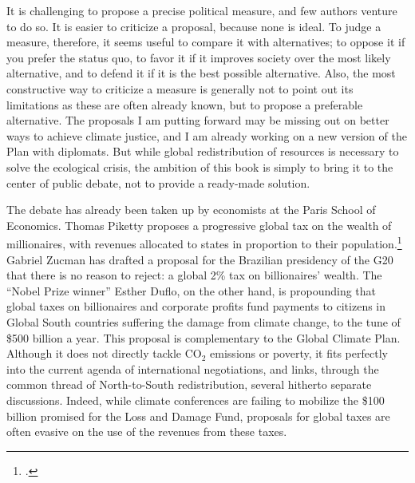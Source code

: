 \documentclass[a5paper,english,openany]{memoir}
\begin{document}
It is challenging %
to propose a precise political measure, and few authors %
venture to do so. It is easier to criticize %
a proposal, because none is ideal. To judge a measure, therefore, it seems useful to compare it with alternatives; to oppose it if you prefer the status quo, to favor %
it if it improves society over the most likely alternative, and to defend it if it is the best possible alternative. Also, the most constructive way to criticize %
a measure is generally not to point out its limitations  as these are often already known, %
but to propose a preferable alternative. 
The proposals I am putting forward %
may be missing out on better ways to achieve %
climate justice, and I am already working on a new version of the Plan with diplomats. 
But while global redistribution of resources is necessary to solve the ecological crisis, the ambition of this book is simply to bring it to the center %
of public debate, not to provide a ready-made solution. 

The debate has already been taken up by economists at the Paris School of Economics. Thomas Piketty proposes %
a progressive global tax on the wealth of millionaires, with revenues allocated to states in proportion to their population.\footnote{\citet{piketty_brief_2022}.} 
Gabriel Zucman has drafted a proposal for the Brazilian presidency of the G20 that there is no reason to reject: a global 2\% tax on billionaires' wealth. %
The ``Nobel Prize winner'' %
Esther Duflo, on the other hand, is propounding %
that global taxes on billionaires and corporate profits fund payments to citizens in Global South countries suffering the damage from %
climate change, to the tune of \$500 billion a year. This proposal is complementary to the Global Climate Plan. Although %
it does not directly tackle CO$_\text{2}$ emissions or poverty, it fits perfectly into the current agenda of international negotiations, and links, through the common thread of North-to-South redistribution,  %
several hitherto separate discussions. Indeed, while climate conferences are failing to mobilize the \$100 billion promised for the Loss and Damage Fund, proposals for global taxes are often evasive on the use of the revenues from these taxes. 
\end{document}
